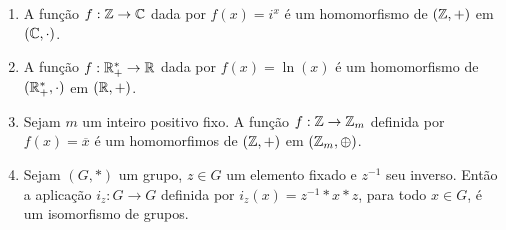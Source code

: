\documentclass{beamer}
\begin{document}
    \begin{frame}
        \begin{exemplos}
            \begin{enumerate}[label={\arabic*})]
                \item A fun\c{c}\~ao $f : \mathbb{Z} \to \mathbb{C}$ dada por $f(x) = i^x$ \'e um homomorfismo de $(\mathbb{Z}, +)$ em $(\mathbb{C}, \cdot)$.

                \item A fun\c{c}\~ao $f : \mathbb{R}^*_+ \to \mathbb{R}$ dada por $f(x) = \ln(x)$ \'e um homomorfismo de $(\mathbb{R}^*_+, \cdot)$ em $(\mathbb{R}, +)$.

                \item Sejam $m$ um inteiro positivo fixo. A fun\c{c}\~ao $f: \mathbb{Z} \to \mathbb{Z}_m$ definida por $f(x) = \overline{x}$ \'e um homomorfimos de $(\mathbb{Z}, +)$ em $(\mathbb{Z}_m, \oplus)$.

                \item Sejam $(G, *)$ um grupo, $z\in G$ um elemento fixado e $z^{-1}$ seu inverso. Então a aplica{\c c}{\~a}o $i_z: G\to G$ definida por $i_z(x)=z^{-1}*x*z$, para todo $x \in G$, {\'e} um isomorfismo de grupos.
            \end{enumerate}
        \end{exemplos}
    \end{frame}
\end{document}
